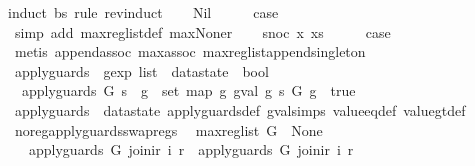 \begin{isabellebody}
{\isacharparenleft}induct\ bs\ rule{\isacharcolon}\ rev{\isacharunderscore}induct{\isacharparenright}\isanewline
\ \ \isamarkupfalse%
\ Nil\isanewline
\ \ \isamarkupfalse%
\ \isamarkupfalse%
\ {\isacharquery}case\isanewline
\ \ \ \ \isamarkupfalse%
\ {\isacharparenleft}simp\ add{\isacharcolon}\ max{\isacharunderscore}reg{\isacharunderscore}list{\isacharunderscore}def\ max{\isacharunderscore}None{\isacharunderscore}r{\isacharparenright}\isanewline
{}\isamarkupfalse%
\isanewline
\ \ \isamarkupfalse%
\ {\isacharparenleft}snoc\ x\ xs{\isacharparenright}\isanewline
\ \ \isamarkupfalse%
\ \isamarkupfalse%
\ {\isacharquery}case\isanewline
\ \ \ \ \isamarkupfalse%
\ {\isacharparenleft}metis\ append{\isacharunderscore}assoc\ max{\isachardot}assoc\ max{\isacharunderscore}reg{\isacharunderscore}list{\isacharunderscore}append{\isacharunderscore}singleton{\isacharparenright}\isanewline
{}\isamarkupfalse%
%
\endisatagproof
{\isafoldproof}%
%
\isadelimproof
\isanewline
%
\endisadelimproof
\isanewline
{}\isamarkupfalse%
\ apply{\isacharunderscore}guards\ {\isacharcolon}{\isacharcolon}\ {\isachardoublequoteopen}gexp\ list\ {\isasymRightarrow}\ datastate\ {\isasymRightarrow}\ bool{\isachardoublequoteclose}\ \isanewline
\ \ {\isachardoublequoteopen}apply{\isacharunderscore}guards\ G\ s\ {\isacharequal}\ {\isacharparenleft}{\isasymforall}g\ {\isasymin}\ set\ {\isacharparenleft}map\ {\isacharparenleft}{\isasymlambda}g{\isachardot}\ gval\ g\ s{\isacharparenright}\ G{\isacharparenright}{\isachardot}\ g\ {\isacharequal}\ true{\isacharparenright}{\isachardoublequoteclose}\isanewline
\isanewline
{}\isamarkupfalse%
\ apply{\isacharunderscore}guards\ {\isacharequal}\ datastate\ apply{\isacharunderscore}guards{\isacharunderscore}def\ gval{\isachardot}simps\ value{\isacharunderscore}eq{\isacharunderscore}def\ value{\isacharunderscore}gt{\isacharunderscore}def\isanewline
\isanewline
{}\isamarkupfalse%
\ no{\isacharunderscore}reg{\isacharunderscore}apply{\isacharunderscore}guards{\isacharunderscore}swap{\isacharunderscore}regs{\isacharcolon}\isanewline
\ \ {\isachardoublequoteopen}max{\isacharunderscore}reg{\isacharunderscore}list\ G\ {\isacharequal}\ None\ {\isasymLongrightarrow}\isanewline
\ \ \ apply{\isacharunderscore}guards\ G\ {\isacharparenleft}join{\isacharunderscore}ir\ i\ r{\isacharparenright}\ {\isacharequal}\ apply{\isacharunderscore}guards\ G\ {\isacharparenleft}join{\isacharunderscore}ir\ i\ r{\isacharprime}{\isacharparenright}{\isachardoublequoteclose}\isanewline

\end{isabellebody}
